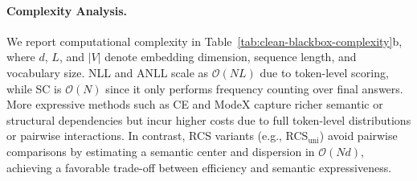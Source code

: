 
\paragraph{Complexity Analysis.}\label{sec:complexity}

We report computational complexity in Table~\ref{tab:clean-blackbox-complexity}b, where $d$, $L$, and $|V|$ denote embedding dimension, sequence length, and vocabulary size.
NLL and ANLL scale as $\mathcal{O}(NL)$ due to token-level scoring, while SC is $\mathcal{O}(N)$ since it only performs frequency counting over final answers. More expressive methods such as CE and ModeX capture richer semantic or structural dependencies but incur higher costs due to full token-level distributions or pairwise interactions.
In contrast, RCS variants (e.g., RCS$_\text{uni}$) avoid pairwise comparisons by estimating a semantic center and dispersion in $\mathcal{O}(Nd)$, achieving a favorable trade-off between efficiency and semantic expressiveness.

